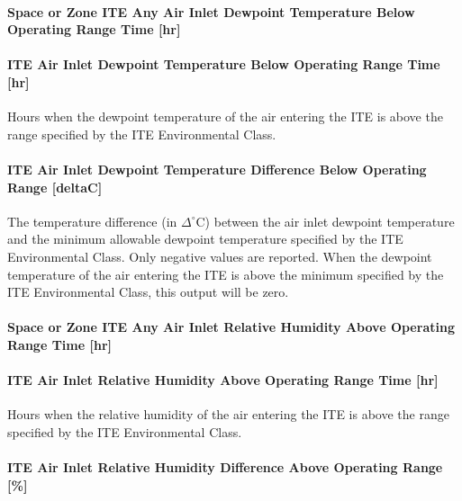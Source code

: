 \paragraph{Space or Zone ITE Any Air Inlet Dewpoint Temperature Below Operating Range Time {[}hr{]}}\label{zone-ite-any-air-inlet-dewpoint-temperature-below-operating-range-time-hr}

\paragraph{ITE Air Inlet Dewpoint Temperature Below Operating Range Time {[}hr{]}}\label{ite-air-inlet-dewpoint-temperature-below-operating-range-time-hr}

Hours when the dewpoint temperature of the air entering the ITE is above the range specified by the ITE Environmental Class.

\paragraph{ITE Air Inlet Dewpoint Temperature Difference Below Operating Range {[}deltaC{]}}\label{ite-air-inlet-dewpoint-temperature-difference-below-operating-range-deltac}

The temperature difference (in $\Delta^{\circ}$C) between the air inlet dewpoint temperature and the minimum allowable dewpoint temperature specified by the ITE Environmental Class. Only negative values are reported. When the dewpoint temperature of the air entering the ITE is above the minimum specified by the ITE Environmental Class, this output will be zero.

\paragraph{Space or Zone ITE Any Air Inlet Relative Humidity Above Operating Range Time {[}hr{]}}\label{zone-ite-any-air-inlet-relative-humidity-above-operating-range-time-hr}

\paragraph{ITE Air Inlet Relative Humidity Above Operating Range Time {[}hr{]}}\label{ite-air-inlet-relative-humidity-above-operating-range-time-hr}

Hours when the relative humidity of the air entering the ITE is above the range specified by the ITE Environmental Class.

\paragraph{ITE Air Inlet Relative Humidity Difference Above Operating Range {[}\%{]}}\label{ite-air-inlet-relative-humidity-difference-above-operating-range}

